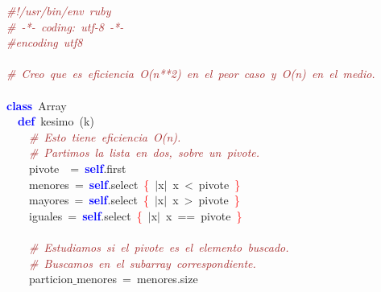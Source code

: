 \noindent
\mbox{}\textit{\textcolor{Brown}{\#!/usr/bin/env\ ruby}} \\
\mbox{}\textit{\textcolor{Brown}{\#\ -*-\ coding:\ utf-8\ -*-}} \\
\mbox{}\textit{\textcolor{Brown}{\#encoding\ utf8}} \\
\mbox{} \\
\mbox{}\textit{\textcolor{Brown}{\#\ Creo\ que\ es\ eficiencia\ O(n**2)\ en\ el\ peor\ caso\ y\ O(n)\ en\ el\ medio.}} \\
\mbox{} \\
\mbox{}\textbf{\textcolor{Blue}{class}}\ Array \\
\mbox{}\ \ \textbf{\textcolor{Blue}{def}}\ kesimo\ \textcolor{BrickRed}{(}k\textcolor{BrickRed}{)} \\
\mbox{}\ \ \ \ \textit{\textcolor{Brown}{\#\ Esto\ tiene\ eficiencia\ O(n).}} \\
\mbox{}\ \ \ \ \textit{\textcolor{Brown}{\#\ Partimos\ la\ lista\ en\ dos,\ sobre\ un\ pivote.}} \\
\mbox{}\ \ \ \ pivote\ \ \textcolor{BrickRed}{=}\ \textbf{\textcolor{Blue}{self}}\textcolor{BrickRed}{.}first \\
\mbox{}\ \ \ \ menores\ \textcolor{BrickRed}{=}\ \textbf{\textcolor{Blue}{self}}\textcolor{BrickRed}{.}select\ \textcolor{Red}{\{}\ \textcolor{BrickRed}{$|$}x\textcolor{BrickRed}{$|$}\ x\ \textcolor{BrickRed}{\textless{}}\ pivote\ \textcolor{Red}{\}} \\
\mbox{}\ \ \ \ mayores\ \textcolor{BrickRed}{=}\ \textbf{\textcolor{Blue}{self}}\textcolor{BrickRed}{.}select\ \textcolor{Red}{\{}\ \textcolor{BrickRed}{$|$}x\textcolor{BrickRed}{$|$}\ x\ \textcolor{BrickRed}{\textgreater{}}\ pivote\ \textcolor{Red}{\}} \\
\mbox{}\ \ \ \ iguales\ \textcolor{BrickRed}{=}\ \textbf{\textcolor{Blue}{self}}\textcolor{BrickRed}{.}select\ \textcolor{Red}{\{}\ \textcolor{BrickRed}{$|$}x\textcolor{BrickRed}{$|$}\ x\ \textcolor{BrickRed}{==}\ pivote\ \textcolor{Red}{\}} \\
\mbox{} \\
\mbox{}\ \ \ \ \textit{\textcolor{Brown}{\#\ Estudiamos\ si\ el\ pivote\ es\ el\ elemento\ buscado.}} \\
\mbox{}\ \ \ \ \textit{\textcolor{Brown}{\#\ Buscamos\ en\ el\ subarray\ correspondiente.}} \\
\mbox{}\ \ \ \ particion$\_$menores\ \textcolor{BrickRed}{=}\ menores\textcolor{BrickRed}{.}size \\
